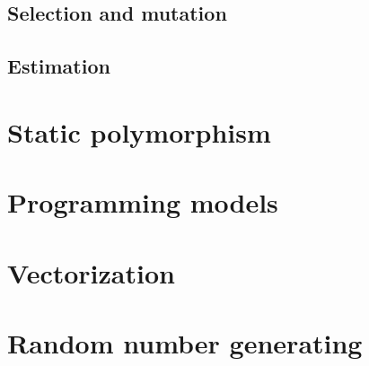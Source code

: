 \subsection{Selection and mutation}
\label{sub:Selection and mutation}

\subsection{Estimation}
\label{sub:Estimation}

\section{Static polymorphism}
\label{sec:Static polymorphism}

\section{Programming models}
\label{sec:Programming models}

\section{Vectorization}
\label{sec:Vectorization}

\section{Random number generating}
\label{sec:Random number generating}
